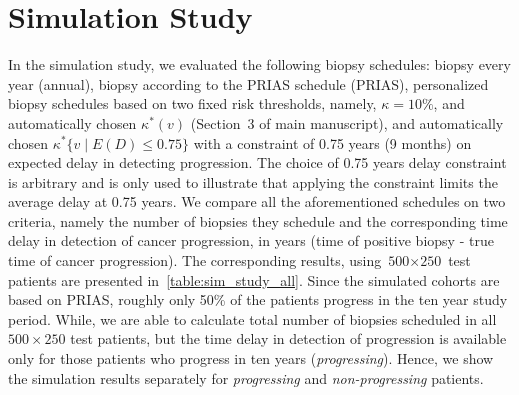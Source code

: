 \section{Simulation Study}
In the simulation study, we evaluated the following biopsy schedules: biopsy every year (annual), biopsy according to the PRIAS schedule (PRIAS), personalized biopsy schedules based on two fixed risk thresholds, namely, $\kappa=10\%$, and automatically chosen $\kappa^*(v)$ (Section~3 of main manuscript), and automatically chosen ${\kappa^*\{v \mid E(D)\leq 0.75\}}$ with a constraint of 0.75 years (9 months) on expected delay in detecting progression. The choice of 0.75 years delay constraint is arbitrary and is only used to illustrate that applying the constraint limits the average delay at 0.75 years.  We compare all the aforementioned schedules on two criteria, namely the number of biopsies they schedule and the corresponding time delay in detection of cancer progression, in years (time of positive biopsy - true time of cancer progression). The corresponding results, using ${\mbox{500} \times \mbox{250}}$ test patients are presented in~\ref{table:sim_study_all}. Since the simulated cohorts are based on PRIAS, roughly only 50\% of the patients progress in the ten year study period. While, we are able to calculate total number of biopsies scheduled in all $500 \times 250$ test patients, but the time delay in detection of progression is available only for those patients who progress in ten years (\textit{progressing}). Hence, we show the simulation results separately for \textit{progressing} and \textit{non-progressing} patients.

